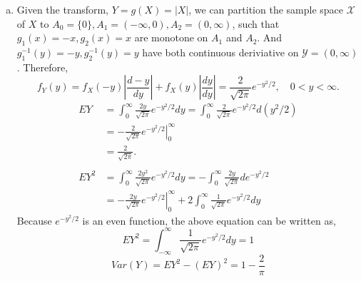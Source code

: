 \documentclass[letter]{article}
\newcommand{\intii}{\int_{-\infty}^\infty}
\newcommand{\intzi}{\int_0^\infty}
\begin{document}
\begin{enumerate}[(a)]
    \item Given the transform, $Y = g(X) = |X|$, we can partition the sample space $\mathcal{X}$ of $X$ to $A_0 = \{0\}, A_1 = (-\infty, 0), A_2 = (0, \infty)$, such that $g_1(x) = -x, g_2(x) = x$ are monotone on $A_1$ and $A_2$. 
    And $g_1^{-1}(y) = -y, g_2^{-1}(y) = y$ have both continuous deriviative on $\mathcal{Y} = (0, \infty)$.
    Therefore,
    \[
    f_Y(y) = f_X(-y)\left|\frac{d-y}{dy}\right| + 
    f_X(y)\left|\frac{dy}{dy}\right| 
    = \frac{2}{\sqrt{2\pi}} e^{-y^2/2}, \quad 0 < y < \infty.
    \]
    \begin{align*}
    EY & = \intzi \frac{2y}{\sqrt{2\pi}} e^{-y^2/2} dy 
    = \intzi \frac{2}{\sqrt{2\pi}} e^{-y^2/2} d(y^2/2) \\
    & = -\frac{2}{\sqrt{2\pi}} \left. e^{-y^2/2} \right|_0^\infty \\
    & = \frac{2}{\sqrt{2\pi}}.\\
    \\
    EY^2 &= \intzi \frac{2y^2}{\sqrt{2\pi}} e^{-y^2/2} dy 
    = -\intzi \frac{2y}{\sqrt{2\pi}} de^{-y^2/2} \\
    & = -\left. \frac{2y}{\sqrt{2\pi}} e^{-y^2/2} \right|_0^\infty +
    2 \intzi \frac{1}{\sqrt{2\pi}} e^{-y^2/2} dy
    \end{align*}
    Because $e^{-y^2/2}$ is an even function, the above equation can be written as,
    \[
    EY^2 = \intii \frac{1}{\sqrt{2\pi}} e^{-y^2/2} dy = 1
    \]
    \[
    Var(Y) = EY^2 - (EY)^2 = 1 - \frac{2}{\pi}
    \]

    \end{enumerate}
\end{document}
